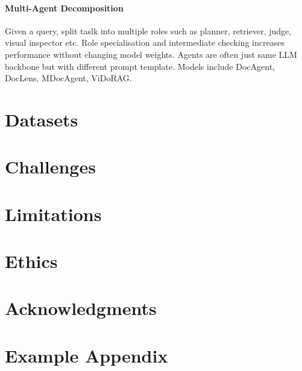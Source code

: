 \documentclass[11pt]{article}
\begin{document}
\paragraph{Multi-Agent Decomposition}
Given a query, split taslk into multiple roles such as planner, retriever, judge, visual inspector etc. Role specialisation and intermediate checking increases performance without changing model weights. Agents are often just same LLM backbone but with different prompt template. Models include DocAgent, DocLens, MDocAgent, ViDoRAG.

\section{Datasets}

\section{Challenges}

\section{Limitations}

\section{Ethics}

\section*{Acknowledgments}

%


\appendix

\section{Example Appendix}
\label{sec:appendix}


\end{document}
